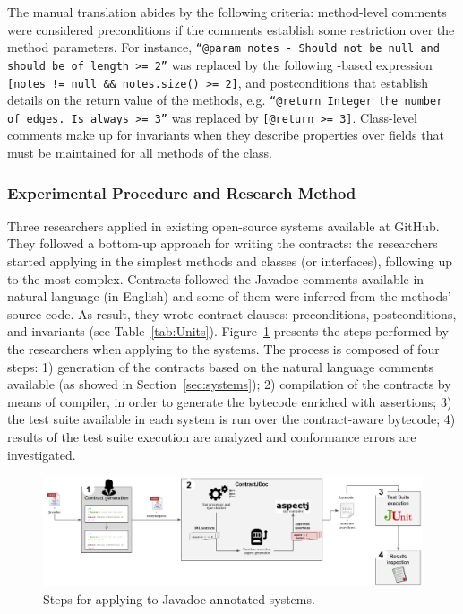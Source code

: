 The manual translation abides by the following criteria: method-level comments were considered preconditions
if the comments establish some restriction over the method parameters.
For instance, \texttt{``@param notes - Should not be null and should be of length >= 2''} was
replaced by the following \contractjdoc{}-based expression \texttt{[notes != null \&\& notes.size() >= 2]}, and
postconditions that establish details on the return value of the
methods, e.g. \texttt{``@return Integer the number of edges. Is always >= 3''}
was replaced by \texttt{[@return >= 3]}. Class-level comments make up for
invariants when they describe properties over fields that must be maintained for
all methods of the class.

\subsubsection{Experimental Procedure and Research Method} 

Three researchers applied \contractjdoc{} in \totalSystems{} existing open-source systems
available at GitHub. They followed a bottom-up approach for
writing the \contractjdoc{} contracts: the researchers started applying
\contractjdoc{} in the simplest methods and classes (or interfaces), following
up to the most complex. Contracts followed the Javadoc comments available in
natural language (in English) and some of them were inferred from the methods'
source code.
As result, they wrote \totalClauses{} contract clauses:
\totalPre{} preconditions, \totalPost{} postconditions, and \totalInv{} invariants (see
Table~\ref{tab:Units}).
Figure~\ref{fig:applicationProcess} presents the steps performed by the researchers when applying
\contractjdoc{} to the systems. The process is composed of four steps: 1) generation of the
contracts based on the natural language comments available (as showed in
Section~\ref{sec:systems}); 2) compilation of the contracts by means of
\contractjdocCompiler{} compiler, in order to generate the bytecode enriched
with assertions; 3) the test suite available in each system is run over the
contract-aware bytecode; 4) results of the test suite execution are analyzed and
conformance errors are investigated.

\begin{figure}[h]
\centering
\includegraphics[width=1.0\textwidth]{figs/ContractJDocProcess}
\caption{Steps for applying \contractjdoc{} to Javadoc-annotated systems.}
\label{fig:applicationProcess}
\end{figure}

